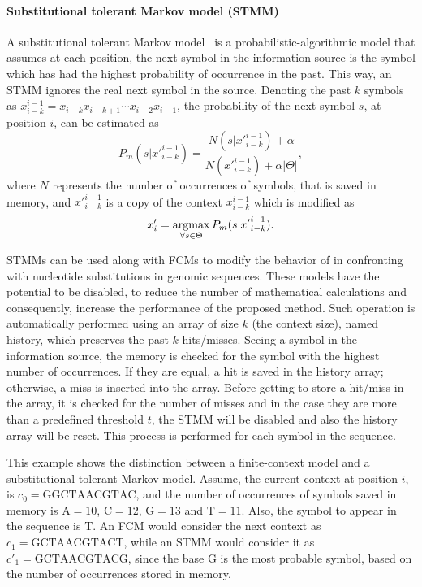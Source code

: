 \paragraph{Substitutional tolerant Markov model (STMM)}
A substitutional tolerant Markov model~\cite{pratas2017substitutional} is a probabilistic-algorithmic model that assumes at each position, the next symbol in the information source is the symbol which has had the highest probability of occurrence in the past. This way, an STMM ignores the real next symbol in the source. Denoting the past $k$ symbols as $x_{i-k}^{i-1} = x_{i-k} x_{i-k+1}\cdots x_{i-2} x_{i-1}$, the probability of the next symbol $s$, at position $i$, can be estimated as
\begin{equation}
P_m(s|{x'}_{i-k}^{i-1}) = \frac{N(s|{x'}_{i-k}^{i-1})+\alpha}
{N({x'}_{i-k}^{i-1})+ \alpha|\Theta|},
\end{equation}
where $N$ represents the number of occurrences of symbols, that is saved in memory, and ${x'}_{i-k}^{i-1}$ is a copy of the context $x_{i-k}^{i-1}$ which is modified as 
\begin{equation}
x'_{i} = \operatorname*{argmax}_{\forall s \in \Theta}{P_m(s|{x'}_{i-k}^{i-1})}.
\end{equation}

STMMs can be used along with FCMs to modify the behavior of \smashpp in confronting with nucleotide substitutions in genomic sequences. These models have the potential to be disabled, to reduce the number of mathematical calculations and consequently, increase the performance of the proposed method. Such operation is automatically performed using an array of size $k$ (the context size), named history, which preserves the past $k$ hits/misses. Seeing a symbol in the information source, the memory is checked for the symbol with the highest number of occurrences. If they are equal, a hit is saved in the history array; otherwise, a miss is inserted into the array. Before getting to store a hit/miss in the array, it is checked for the number of misses and in the case they are more than a predefined threshold $t$, the STMM will be disabled and also the history array will be reset. This process is performed for each symbol in the sequence.

This example shows the distinction between a finite-context model and a substitutional tolerant Markov model. Assume, the current context at position $i$, is $c_0=\textrm{GGCTAACGTAC}$, and the number of occurrences of symbols saved in memory is $\textrm{A}=10$, $\textrm{C}=12$, $\textrm{G}=13$ and $\textrm{T}=11$. Also, the symbol to appear in the sequence is $\textrm{T}$. An FCM would consider the next context as $c_1=\textrm{GCTAACGTACT}$, while an STMM would consider it as $c'_1=\textrm{GCTAACGTACG}$, since the base $\textrm{G}$ is the most probable symbol, based on the number of occurrences stored in memory.

